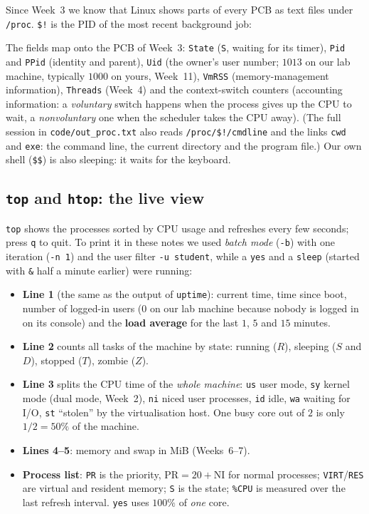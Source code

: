\documentclass[11pt,a4paper]{article}
\newcommand{\term}[1]{\textbf{\color{mintdeep}#1}}
\newcommand{\cmd}[1]{\texttt{#1}}
\begin{document}
Since Week~3 we know that Linux shows parts of every PCB as text files under \texttt{/proc}. \verb|$!| is the PID of the most recent background job:



The fields map onto the PCB of Week~3: \texttt{State} (\texttt{S}, waiting for its timer), \texttt{Pid} and \texttt{PPid} (identity and parent), \texttt{Uid} (the owner's user number; $1013$ on our lab machine, typically $1000$ on yours, Week~11), \texttt{VmRSS} (memory-management information), \texttt{Threads} (Week~4) and the context-switch counters (accounting information: a \emph{voluntary} switch happens when the process gives up the CPU to wait, a \emph{nonvoluntary} one when the scheduler takes the CPU away). (The full session in \texttt{code/out\_proc.txt} also reads \texttt{/proc/\$!/cmdline} and the links \texttt{cwd} and \texttt{exe}: the command line, the current directory and the program file.) Our own shell (\verb|$$|) is also sleeping: it waits for the keyboard.

\subsection{\texttt{top} and \texttt{htop}: the live view}
\label{sec:top}

\cmd{top} shows the processes sorted by CPU usage and refreshes every few seconds; press \texttt{q} to quit. To print it in these notes we used \emph{batch mode} (\cmd{-b}) with one iteration (\cmd{-n 1}) and the user filter \cmd{-u student}, while a \cmd{yes} and a \cmd{sleep} (started with \texttt{\&} half a minute earlier) were running:



\begin{itemize}
  \item \textbf{Line 1} (the same as the output of \cmd{uptime}): current time, time since boot, number of logged-in users ($0$ on our lab machine because nobody is logged in on its console) and the \term{load average} for the last $1$, $5$ and $15$ minutes.
  \item \textbf{Line 2} counts all tasks of the machine by state: running ($R$), sleeping ($S$ and $D$), stopped ($T$), zombie ($Z$).
  \item \textbf{Line 3} splits the CPU time of the \emph{whole machine}: \texttt{us} user mode, \texttt{sy} kernel mode (dual mode, Week~2), \texttt{ni} niced user processes, \texttt{id} idle, \texttt{wa} waiting for I/O, \texttt{st} ``stolen'' by the virtualisation host. One busy core out of $2$ is only $1/2 = 50\%$ of the machine.
  \item \textbf{Lines 4--5}: memory and swap in MiB (Weeks~6--7).
  \item \textbf{Process list}: \texttt{PR} is the priority, $\text{PR} = 20 + \text{NI}$ for normal processes; \texttt{VIRT}/\texttt{RES} are virtual and resident memory; \texttt{S} is the state; \texttt{\%CPU} is measured over the last refresh interval. \cmd{yes} uses $100\%$ of \emph{one} core.
\end{itemize}
\end{document}
